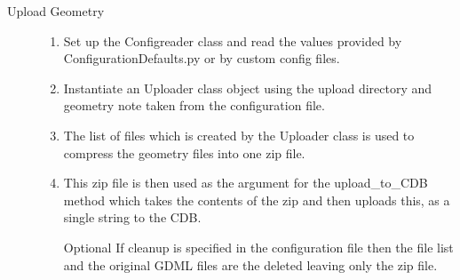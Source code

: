 \begin{description}
  \item[Upload Geometry] \hfill 
  \begin{enumerate}
   \item Set up the Configreader class and read the values provided by ConfigurationDefaults.py or by custom config files.
   \item Instantiate an Uploader class object using the upload directory and geometry note taken from the configuration file.
   \item The list of files which is created by the Uploader class is used to compress the geometry files into one zip file.
   \item This zip file is then used as the argument for the upload\_to\_CDB method which takes the contents of the zip and then uploads this, as a
single string to the CDB.
   \item[Optional] If cleanup is specified in the configuration file then the file list and the original GDML files are the deleted leaving only the
zip file.
  \end{enumerate}


\end{description}

